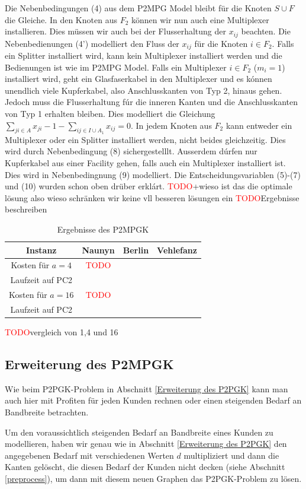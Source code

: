 \documentclass[11pt,a4paper]{article}
\newcommand{\TODO}{\textcolor{red}{TODO}}
\theoremstyle{my_th_style1}
\begin{document}
  Die Nebenbedingungen (4) aus dem P2MPG Model bleibt für die Knoten $S \cup F$ die Gleiche. In den Knoten aus $F_2$ können wir nun auch eine Multiplexer installieren. Dies müssen wir auch bei der Flusserhaltung der $x_{ij}$ beachten. Die Nebenbedienungen (4') modelliert den Fluss der $x_{ij}$ für die Knoten $i \in F_2$. Falls ein Splitter installiert wird, kann kein Multiplexer installiert werden und die Bedienungen ist wie im P2MPG Model. Falls ein Multiplexer $i \in F_2$ ($m_i=1$) installiert wird, geht ein Glasfaserkabel in den Multiplexer und es k\'onnen unendlich viele Kupferkabel, also Anschlusskanten von Typ 2, hinaus gehen. Jedoch muss die Flusserhaltung f\'ur die inneren Kanten und die Anschlusskanten von Typ 1 erhalten bleiben. Dies modelliert die Gleichung $\displaystyle\sum_{ji \in A} x_{ji} -1 - \displaystyle\sum_{ij \in I \cup A_1} x_{ij}=0$.  In jedem Knoten aus $F_2$ kann entweder ein Multiplexer oder ein Splitter installiert werden, nicht beides gleichzeitig. Dies wird durch Nebenbedingung (8) sichergestelllt. Ausserdem d\'urfen nur Kupferkabel aus einer Facility gehen, falls auch ein Multiplexer installiert ist. Dies wird in Nebenbedingnung (9) modelliert. Die Entscheidungsvariablen (5)-(7) und (10)
wurden schon oben dr\"uber erkl\'art.   
   \TODO+wieso ist das die optimale lösung also wieso schränken wir keine vll besseren lösungen ein
   \TODO Ergebnisse beschreiben
 \begin{table}[h]
	\centering
	\begin{tabular}{c|c|c|c}
		Instanz & Naunyn & Berlin & Vehlefanz \\	
		\hline
		Kosten für $a=4$ & \TODO &  &  \\
		Laufzeit auf PC2 &  &  & \\
		\hline
		Kosten für $a=16$ & \TODO &  &  \\
		Laufzeit auf PC2 &  &  & \\
	\end{tabular}
	\label{P2MPGK}
	\caption{Ergebnisse des P2MPGK} 
\end{table}
\TODO vergleich von 1,4 und 16 
   
 \subsection{Erweiterung des P2MPGK}
 Wie beim P2PGK-Problem in Abschnitt \ref{Erweiterung des P2PGK} kann man auch hier mit Profiten f\"ur jeden Kunden rechnen oder einen steigenden Bedarf an Bandbreite betrachten.
 
 Um den voraussichtlich steigenden Bedarf an Bandbreite eines Kunden zu modellieren, haben wir genau wie in Abschnitt \ref{Erweiterung des P2PGK} den angegebenen Bedarf mit verschiedenen Werten $d$ multipliziert und dann die Kanten gel\"oscht, die diesen Bedarf der Kunden nicht decken (siehe Abschnitt \ref{preprocess}), um dann mit diesem neuen Graphen das P2PGK-Problem zu l\"osen.
 
\end{document}
